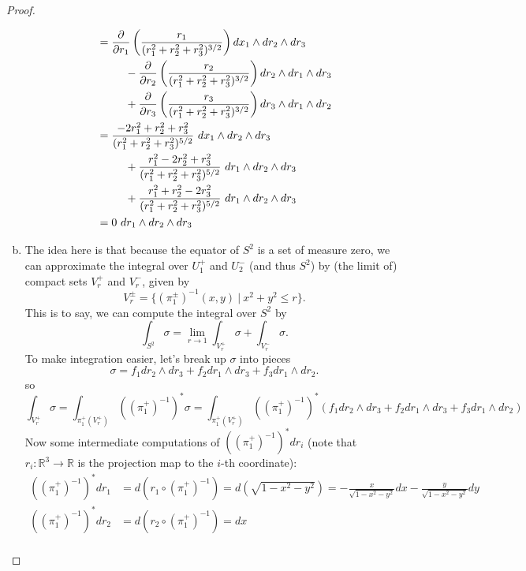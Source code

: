 \documentclass{article}
\begin{document}
\begin{proof}
\begin{enumerate}[(a)]
\begin{align*}
      &= \frac{\partial}{\partial r_1}\left(\frac{r_1}{(r_1^2 + r_2^2 + r_3^2)^{3/2}}\right)dx_1 \wedge dr_2 \wedge dr_3\\
        &\hspace{0.9cm}- \frac{\partial}{\partial r_2}\left(\frac{r_2}{(r_1^2 + r_2^2 + r_3^2)^{3/2}}\right)dr_2 \wedge dr_1 \wedge dr_3\\
        &\hspace{0.9cm}+ \frac{\partial}{\partial r_3}\left(\frac{r_3}{(r_1^2 + r_2^2 + r_3^2)^{3/2}}\right) dr_3 \wedge dr_1\wedge dr_2\\
      &= \frac{-2r_1^2 + r_2^2 + r_3^2}{(r_1^2 + r_2^2 + r_3^2)^{5/2}}\ dx_1 \wedge dr_2 \wedge dr_3\\
        &\hspace{0.9cm}+ \frac{r_1^2 - 2r_2^2 + r_3^2}{(r_1^2 + r_2^2 + r_3^2)^{5/2}}\ dr_1 \wedge dr_2 \wedge dr_3\\
        &\hspace{0.9cm}+ \frac{r_1^2 + r_2^2 - 2r_3^2}{(r_1^2 + r_2^2 + r_3^2)^{5/2}}\ dr_1 \wedge dr_2\wedge dr_3\\
      &= 0\ dr_1 \wedge dr_2\wedge dr_3
    \end{align*}
    \item The idea here is that because the equator of $S^2$ is a set of measure
    zero, we can approximate the integral over $U_1^+$ and $U_2^-$ (and thus
    $S^2$) by (the limit of) compact sets $V_r^+$ and $V_r^-$, given by \[
      V_r^\pm = \{ (\pi^\pm_1)^{-1}(x, y)\ |\ x^2 + y^2 \leq r \}.
    \]
    This is to say, we can compute the integral over $S^2$ by
    \[
      \int_{S^2} \sigma = \lim_{r \rightarrow 1} \int_{V_r^+} \sigma + \int_{V_r^-} \sigma.
    \]
    To make integration easier, let's break up $\sigma$ into pieces \[
      \sigma = f_1 dr_2 \wedge dr_3 + f_2 dr_1 \wedge dr_3 + f_3 dr_1 \wedge dr_2.
    \] so \[
      \int_{V_r^+} \sigma
      = \int_{\pi_1^+(V_r^+)} ((\pi_1^+)^{-1})^*\sigma
      = \int_{\pi_1^+(V_r^+)} ((\pi_1^+)^{-1})^*(f_1 dr_2 \wedge dr_3 + f_2 dr_1 \wedge dr_3 + f_3 dr_1 \wedge dr_2)
    \]
    Now some intermediate computations of $((\pi_1^+)^{-1})^* dr_i$ (note that
    $r_i\colon \mathbb{R}^3 \rightarrow \mathbb{R}$ is the projection map to
    the $i$-th coordinate): \begin{align*}
      ((\pi_1^+)^{-1})^* dr_1 &= d(r_1 \circ (\pi_1^+)^{-1}) = d(\sqrt{1 - x^2 - y^2}) = -\frac{x}{\sqrt{1 - x^2 - y^2}}dx -\frac{y}{\sqrt{1 - x^2 - y^2}}dy \\
      ((\pi_1^+)^{-1})^* dr_2 &= d(r_2 \circ (\pi_1^+)^{-1}) = dx\\

\end{align*}
\end{enumerate}
\end{proof}
\end{document}
